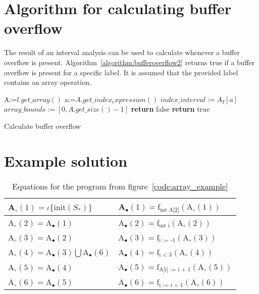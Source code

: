 \section{Algorithm for calculating buffer overflow}
The result of an interval analysis can be used to calculate whenever a buffer overflow is present. Algorithm~\ref{algorithm:bufferoverflow2} returns true if a buffer overflow is present for a specific label. It is assumed that the provided label contains an array operation.
\begin{algorithm}
 \begin{algorithmic}[1]
\State A:=$l.get\_array()$
\State a:=$A.get\_index_expression()$
\State $index\_interval:=A_I[a]$
\State $array\_bounds:=[0,A.get\_size()-1]$
\State \textbf{return} false
\Else
\State \textbf{return} true
\EndIf 
 \EndProcedure
 \end{algorithmic}
 \caption{Calculate buffer overflow}
 \label{algorithm:bufferoverflow2}
\end{algorithm}


\section{Example solution}
\begin{table}[H]
\begin{tabular}{| l | l |}
\hline
A$_\circ (1) = \iota \{\text{init}(S_*) \} $ & A$_\bullet(1) = \text{f}_{\text{int A[2]}} (\text{A}_\circ (1))$ \\
\hline
A$_\circ (2) =$A$_\bullet(1) $ & A$_\bullet(2) = \text{f}_{\text{int i}} (\text{A}_\circ (2))$ \\
\hline
A$_\circ (3) = $A$_\bullet(2)$ & A$_\bullet(3) = \text{f}_{\text{i := -1}} (\text{A}_\circ (3))$  \\
\hline
A$_\circ (4) = $A$_\bullet(3) \bigcup $A$_\bullet(6) $ & A$_\bullet(4) = \text{f}_{\text{i < 3}} (\text{A}_\circ (4))$ \\
\hline
A$_\circ (5) = $A$_\bullet(4)$ & A$_\bullet(5) = \text{f}_{\text{A[i] := i + 1}} (\text{A}_\circ (5))$ \\
\hline
A$_\circ (6) = $A$_\bullet(5)$ & A$_\bullet(6) = \text{f}_{\text{i := i + 1}} (\text{A}_\circ (6))$ \\

\hline
\end{tabular}
\centering
\caption{Equations for the program from figure~\ref{code:array_example}}
\label{table:}
\end{table}

